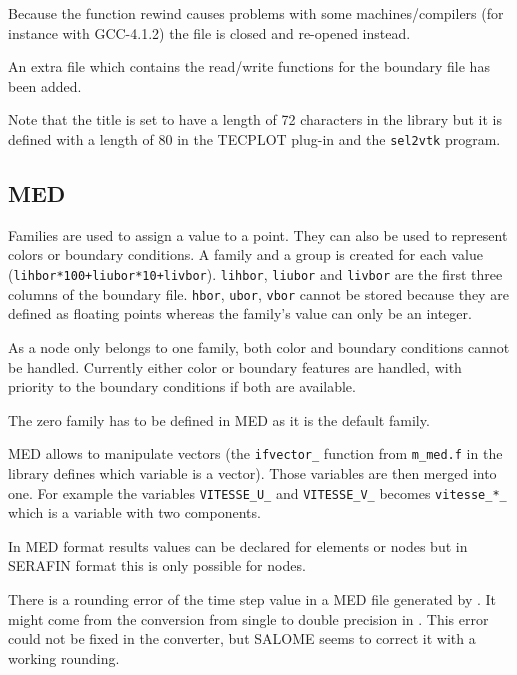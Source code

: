 Because the function rewind causes problems with some machines/compilers (for
instance with GCC-4.1.2) the file is closed and re-opened instead.

An extra file which contains the read/write functions for the boundary file has
been added.

Note that the title is set to have a length of 72 characters in the \bief
library but it is defined with a length of 80 in the TECPLOT plug-in and the
\verb+sel2vtk+ program.

\subsection{MED}

Families are used to assign a value to a point. They can also be used to
represent colors or boundary conditions.  A family and a group is created for
each value (\verb?lihbor*100+liubor*10+livbor?). \verb+lihbor+, \verb+liubor+
and \verb+livbor+ are the first three columns of the boundary file.
\verb+hbor+, \verb+ubor+, \verb+vbor+ cannot be stored because they are defined
as floating points whereas the family's value can only be an integer.

As a node only belongs to one family, both color and boundary conditions cannot
be handled.  Currently either color or boundary features are handled, with
priority to the boundary conditions if both are available.

The zero family has to be defined in MED as it is the default family.

MED allows to manipulate vectors (the \verb+ifvector_+ function from
\verb+m_med.f+ in the \bief library defines which variable is a vector). Those
variables are then merged into one. For example the variables \verb+VITESSE_U_+
and \verb+VITESSE_V_+ becomes \verb+vitesse_*_+ which is a variable with two
components.

In MED format results values can be declared for elements or nodes but in SERAFIN
format this is only possible for nodes.

There is a rounding error of the time step value in a MED file generated by
\telemacsystem. It might come from the conversion from single to double precision in
\telemacsystem. This error could not be fixed in the converter, but SALOME seems to correct
it with a working rounding.

